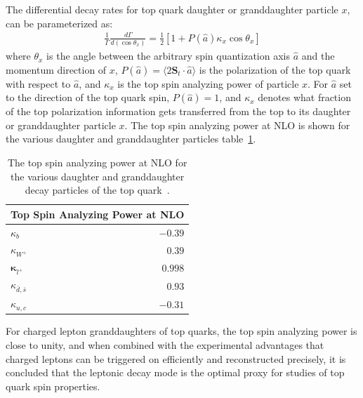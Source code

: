 The differential decay rates for top quark daughter or granddaughter particle $x$, can be parameterized as:
\begin{align}
\frac{1}{\Gamma} \frac{d \Gamma}{d\left(\cos \theta_x\right)}=\frac{1}{2}[1+P(\hat{a})\kappa_x \cos \theta_x]
\end{align}
where $\theta_x$ is the angle between the arbitrary spin quantization axis $\hat{a}$ and the momentum direction of $x$, $P(\hat{a}) = \langle 2 \mathbf{S}_t \cdot \hat{a} \rangle$ is the polarization of the top quark with respect to $\hat{a}$, and $\kappa_x$ is the top spin analyzing power of particle $x$.
For $\hat{a}$ set to the direction of the top quark spin, $P(\hat{a}) = 1$, and $\kappa_x$ denotes what fraction of the top polarization information gets transferred from the top to its daughter or granddaughter particle $x$.
The top spin analyzing power at NLO is shown for the various daughter and granddaughter particles table~\ref{spin_analyzing_power_NLO}.
\begin{table}[!h]
\begin{center}
\begin{tabular}{lr}
\multicolumn{2}{c}{ Top Spin Analyzing Power at NLO } \\
\hline$\kappa_b$ & $-0.39$ \\
$\kappa_{W^{+}}$ & $0.39$ \\
$\boldsymbol{\kappa}_{l^{+}}$ & $\mathbf{0.998}$ \\
$\kappa_{\bar{d}, \bar{s}}$ & $0.93$ \\
$\kappa_{u, c}$ & $-0.31$
\end{tabular}
\caption{The top spin analyzing power at NLO for the various daughter and granddaughter decay particles of the top quark~\cite{BRANDENBURG2002235}.
         }
\label{spin_analyzing_power_NLO}
\end{center}
\end{table}
For charged lepton granddaughters of top quarks, the top spin analyzing power is close to unity, and when combined with the experimental advantages that charged leptons can be triggered on efficiently and reconstructed precisely, it is concluded that the leptonic decay mode is the optimal proxy for studies of top quark spin properties.

